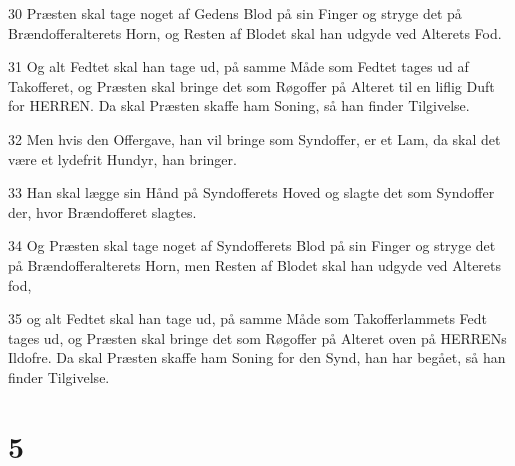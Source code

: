 \par 30 Præsten skal tage noget af Gedens Blod på sin Finger og stryge det på Brændofferalterets Horn, og Resten af Blodet skal han udgyde ved Alterets Fod.
\par 31 Og alt Fedtet skal han tage ud, på samme Måde som Fedtet tages ud af Takofferet, og Præsten skal bringe det som Røgoffer på Alteret til en liflig Duft for HERREN. Da skal Præsten skaffe ham Soning, så han finder Tilgivelse.
\par 32 Men hvis den Offergave, han vil bringe som Syndoffer, er et Lam, da skal det være et lydefrit Hundyr, han bringer.
\par 33 Han skal lægge sin Hånd på Syndofferets Hoved og slagte det som Syndoffer der, hvor Brændofferet slagtes.
\par 34 Og Præsten skal tage noget af Syndofferets Blod på sin Finger og stryge det på Brændofferalterets Horn, men Resten af Blodet skal han udgyde ved Alterets fod,
\par 35 og alt Fedtet skal han tage ud, på samme Måde som Takofferlammets Fedt tages ud, og Præsten skal bringe det som Røgoffer på Alteret oven på HERRENs Ildofre. Da skal Præsten skaffe ham Soning for den Synd, han har begået, så han finder Tilgivelse.

\chapter{5}

